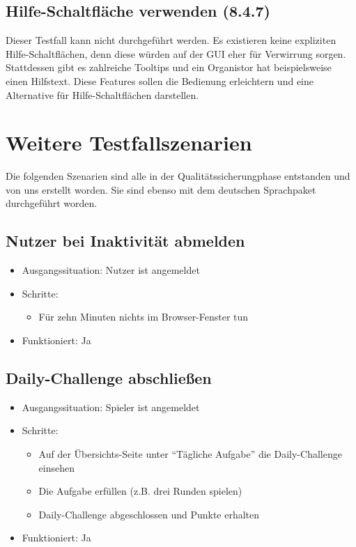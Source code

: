 \documentclass[a4paper]{scrreprt}
\begin{document}
            \subsection{Hilfe-Schaltfläche verwenden (8.4.7)}
            Dieser Testfall kann nicht durchgeführt werden. Es existieren keine expliziten Hilfe-Schaltflächen, denn diese würden auf der GUI eher für Verwirrung sorgen.
            Stattdessen gibt es zahlreiche Tooltips und ein Organistor hat beispielsweise einen Hilfstext. Diese Features sollen die Bedienung erleichtern und eine Alternative für Hilfe-Schaltflächen darstellen.


        \section{Weitere Testfallszenarien}
        Die folgenden Szenarien sind alle in der Qualitätssicherungphase entstanden und von uns erstellt worden. Sie sind ebenso mit dem deutschen Sprachpaket durchgeführt worden.

            \subsection{Nutzer bei Inaktivität abmelden}
            \begin{itemize}
                \item Ausgangssituation: Nutzer ist angemeldet
                \item Schritte:
                    \begin{itemize}
                        \item Für zehn Minuten nichts im Browser-Fenster tun
                    \end{itemize}
                \item Funktioniert: Ja
            \end{itemize}

            \subsection{Daily-Challenge abschließen}
            \begin{itemize}
                \item Ausgangssituation: Spieler ist angemeldet
                \item Schritte:
                    \begin{itemize}
                        \item Auf der Übersichts-Seite unter \enquote{Tägliche Aufgabe} die Daily-Challenge einsehen
                        \item Die Aufgabe erfüllen (z.B. drei Runden spielen)
                        \item Daily-Challenge abgeschlossen und Punkte erhalten
                    \end{itemize}
                \item Funktioniert: Ja
            \end{itemize}
\end{document}
